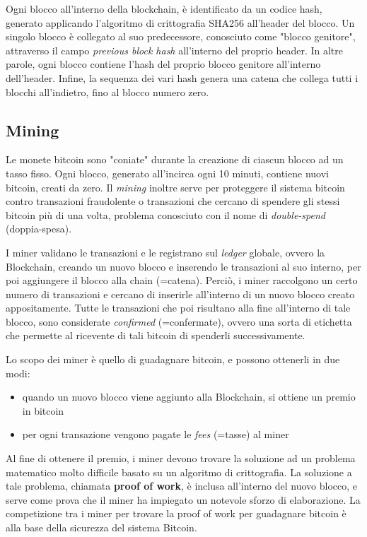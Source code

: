 Ogni blocco all'interno della blockchain, è identificato da un codice hash, generato applicando l'algoritmo di crittografia SHA256 all'header del blocco. Un singolo blocco è collegato al suo predecessore, conosciuto come "blocco genitore", attraverso il campo \textit{previous block hash} all'interno del proprio header. In altre parole, ogni blocco contiene l'hash del proprio blocco genitore all'interno dell'header. Infine, la sequenza dei vari hash genera una catena che collega tutti i blocchi all'indietro, fino al blocco numero zero.

\subsection{Mining}

Le monete bitcoin sono "coniate" durante la creazione di ciascun blocco ad un tasso fisso. Ogni blocco, generato all'incirca ogni 10 minuti, contiene nuovi bitcoin, creati da zero.
Il \textit{mining} inoltre serve per proteggere il sistema bitcoin contro transazioni fraudolente o transazioni che cercano di spendere gli stessi bitcoin più di una volta, problema conosciuto con il nome di \textit{double-spend} (doppia-spesa).

I miner validano le transazioni e le registrano sul \textit{ledger} globale, ovvero la Blockchain, creando un nuovo blocco e inserendo le transazioni al suo interno, per poi aggiungere il blocco alla chain (=catena). Perciò, i miner raccolgono un certo numero di transazioni e cercano di inserirle all'interno di un nuovo blocco creato appositamente. Tutte le transazioni che poi risultano alla fine all'interno di tale blocco, sono considerate \textit{confirmed} (=confermate), ovvero una sorta di etichetta che permette al ricevente di tali bitcoin di spenderli successivamente.

Lo scopo dei miner è quello di guadagnare bitcoin, e possono ottenerli in due modi: 
\begin{itemize}
	\item quando un nuovo blocco viene aggiunto alla Blockchain, si ottiene un premio in bitcoin
	\item per ogni transazione vengono pagate le \textit{fees} (=tasse) al miner
\end{itemize}

Al fine di ottenere il premio, i miner devono trovare la soluzione ad un problema matematico molto difficile basato su un algoritmo di crittografia. La soluzione a tale problema, chiamata \textbf{proof of work}, è inclusa all'interno del nuovo blocco, e serve come prova che il miner ha impiegato un notevole sforzo di elaborazione. La competizione tra i miner per trovare la proof of work per guadagnare bitcoin è alla base della sicurezza del sistema Bitcoin.

